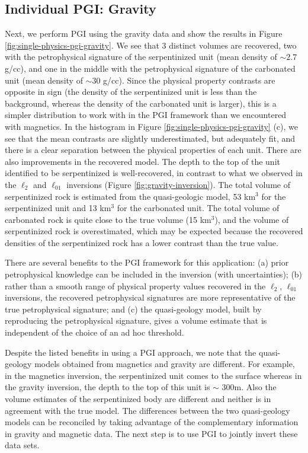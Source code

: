 \documentclass[
    paper,
  ]{geophysics}
\begin{document}
\subsection{Individual PGI: Gravity}
Next, we perform PGI using the gravity data and show the results in Figure \ref{fig:single-physics-pgi-gravity}. We see that 3 distinct volumes are recovered, two with the petrophysical signature of the serpentinized unit (mean density of $\sim2.7$ g/cc), and one in the middle with the petrophysical signature of the carbonated unit (mean density of $\sim30$ g/cc). Since the physical property contrasts are opposite in sign (the density of the serpentinized unit is less than the background, whereas the density of the carbonated unit is larger), this is a simpler distribution to work with in the PGI framework than we encountered with magnetics. In the histogram in Figure \ref{fig:single-physics-pgi-gravity} (c), we see that the mean contrasts are slightly underestimated, but adequately fit, and there is a  clear separation between the physical properties of each unit. There are also improvements in the recovered model. The depth to the top of the unit identified to be serpentinized is well-recovered, in contrast to what we observed in the $\ell_2$ and $\ell_{01}$ inversions (Figure \ref{fig:gravity-inversion}). The total volume of serpentinized rock is estimated from the quasi-geologic model, 53 km$^3$ for the serpentinized unit and 13 km$^3$ for the carbonated unit. The total volume of carbonated rock is quite close to the true volume (15 km$^3$), and the volume of serpentinized rock is overestimated, which may be expected because the recovered densities of the serpentinized rock has a lower contrast than the true value.






There are several benefits to the PGI framework for this application: (a) prior petrophysical knowledge can be included in the inversion (with uncertainties); (b) rather than a smooth range of physical property values recovered in the $\ell_2$, $\ell_{01}$ inversions, the recovered petrophysical signatures are more representative of the true petrophysical signature; and (c) the quasi-geology model, built by reproducing the petrophysical signature, gives a volume estimate that is independent of the choice of an ad hoc threshold.

Despite the listed benefits in using a PGI approach, we note that the quasi-geology models obtained from magnetics and gravity are different. For example, in the magnetics inversion, the serpentinized unit comes to the surface whereas in the gravity inversion, the depth to the top of this unit is $\sim$ 300m. Also the  volume estimates of the serpentinized body are different and neither is in agreement with the true model. The differences between the two quasi-geology models can be reconciled by taking advantage of the complementary information in gravity and magnetic data. The next step is to use PGI to jointly invert these data sets.
\end{document}
